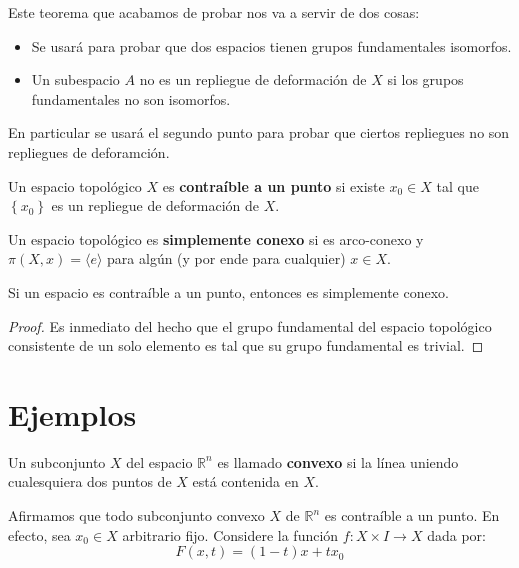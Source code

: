 \documentclass[12pt]{report}
\theoremstyle{largebreak}
\newcommand\cf[3]{\ensuremath{#1:#2\rightarrow#3}}
\begin{document}
    Este teorema que acabamos de probar nos va a servir de dos cosas:
    \begin{itemize}
        \item Se usará para probar que dos espacios tienen grupos fundamentales isomorfos.
        \item Un subespacio $A$ no es un repliegue de deformación de $X$ si los grupos fundamentales no son isomorfos.
    \end{itemize}

    En particular se usará el segundo punto para probar que ciertos repliegues no son repliegues de deforamción.

    \begin{mydef}
        Un espacio topológico $X$ es \textbf{contraíble a un punto} si existe $x_0\in X$ tal que $\left\{x_0\right\}$ es un repliegue de deformación de $X$.
    \end{mydef}

    \begin{mydef}
        Un espacio topológico es \textbf{simplemente conexo} si es arco-conexo y $\pi(X,x)=\langle e\rangle$ para algún (y por ende para cualquier) $x\in X$.
    \end{mydef}

    \begin{cor}
        Si un espacio es contraíble a un punto, entonces es simplemente conexo.
    \end{cor}

    \begin{proof}
        Es inmediato del hecho que el grupo fundamental del espacio topológico consistente de un solo elemento es tal que su grupo fundamental es trivial.
    \end{proof}

    \section{Ejemplos}

    \begin{mydef}
        Un subconjunto $X$ del espacio $\mathbb{R}^n$ es llamado \textbf{convexo} si la línea uniendo cualesquiera dos puntos de $X$ está contenida en $X$.
    \end{mydef}

    Afirmamos que todo subconjunto convexo $X$ de $\mathbb{R}^n$ es contraíble a un punto. En efecto, sea $x_0\in X$ arbitrario fijo. Considere la función $\cf{f}{X\times I}{X}$ dada por:
    \begin{equation*}
        F(x,t)=(1-t)x+tx_0
    \end{equation*}
\end{document}

